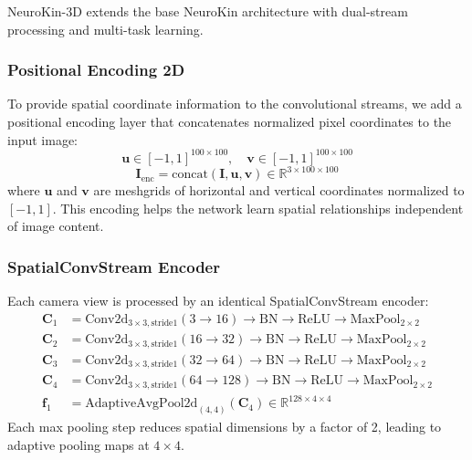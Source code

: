 \documentclass[12pt,a4paper,oneside]{report}
\begin{document}
NeuroKin-3D extends the base NeuroKin architecture with dual-stream processing and multi-task learning.

\subsubsection{Positional Encoding 2D}

To provide spatial coordinate information to the convolutional streams, we add a positional encoding layer that concatenates normalized pixel coordinates to the input image:
\begin{equation}
\mathbf{u} \in [-1, 1]^{100 \times 100}, \quad \mathbf{v} \in [-1, 1]^{100 \times 100}
\end{equation}
\begin{equation}
\mathbf{I}_{\text{enc}} = \text{concat}(\mathbf{I}, \mathbf{u}, \mathbf{v}) \in \mathbb{R}^{3 \times 100 \times 100}
\end{equation}
where $\mathbf{u}$ and $\mathbf{v}$ are meshgrids of horizontal and vertical coordinates normalized to $[-1, 1]$. This encoding helps the network learn spatial relationships independent of image content.

\subsubsection{SpatialConvStream Encoder}

Each camera view is processed by an identical SpatialConvStream encoder:
\begin{align}
\mathbf{C}_1 &= \text{Conv2d}_{3\times3,\text{stride}1}(3 \rightarrow 16) \rightarrow \text{BN} \rightarrow \text{ReLU} \rightarrow \text{MaxPool}_{2\times2} \\
\mathbf{C}_2 &= \text{Conv2d}_{3\times3,\text{stride}1}(16 \rightarrow 32) \rightarrow \text{BN} \rightarrow \text{ReLU} \rightarrow \text{MaxPool}_{2\times2} \\
\mathbf{C}_3 &= \text{Conv2d}_{3\times3,\text{stride}1}(32 \rightarrow 64) \rightarrow \text{BN} \rightarrow \text{ReLU} \rightarrow \text{MaxPool}_{2\times2} \\
\mathbf{C}_4 &= \text{Conv2d}_{3\times3,\text{stride}1}(64 \rightarrow 128) \rightarrow \text{BN} \rightarrow \text{ReLU} \rightarrow \text{MaxPool}_{2\times2} \\
\mathbf{f}_1 &= \text{AdaptiveAvgPool2d}_{(4,4)}(\mathbf{C}_4) \in \mathbb{R}^{128 \times 4 \times 4}
\end{align}
Each max pooling step reduces spatial dimensions by a factor of 2, leading to adaptive pooling maps at $4 \times 4$.
\end{document}
